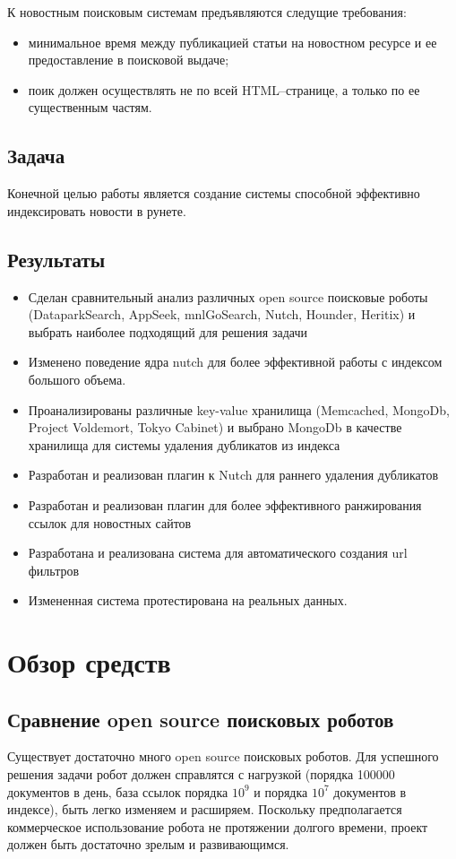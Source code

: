 К новостным поисковым системам предъявляются следущие требования:
\begin{itemize} 
\item минимальное время между публикацией статьи на новостном ресурсе и ее 
    предоставление в поисковой выдаче;
\item поик должен осуществлять не по всей HTML--странице, а только по ее 
    существенным частям. 
\end{itemize}

\section{Задача}
Конечной целью работы является создание системы способной эффективно индексировать новости в рунете.

\section{Результаты}
\begin{itemize}
 \item Сделан сравнительный анализ различных open source поисковые роботы (DataparkSearch,
AppSeek, mnlGoSearch, Nutch, Hounder, Heritix) и выбрать наиболее подходящий для
решения задачи
 \item Изменено поведение ядра nutch для более эффективной работы с индексом большого объема.
 \item Проанализированы различные key-value хранилища (Memcached, MongoDb, Project Voldemort, Tokyo Cabinet) и выбрано MongoDb в качестве хранилища для системы удаления дубликатов из индекса
 \item Разработан и реализован плагин к Nutch для раннего удаления дубликатов
 \item Разработан и реализован плагин для более эффективного ранжирования ссылок для новостных сайтов
 \item Разработана и реализована система для автоматического создания url фильтров
 \item Измененная система протестирована на реальных данных.
\end{itemize}

\chapter{Обзор средств}
\section{Сравнение open source поисковых роботов}
Существует достаточно много open source поисковых роботов. Для успешного решения задачи робот должен справлятся с нагрузкой (порядка 100000 документов в день, база ссылок порядка $10^{9}$ и порядка $10^7$ документов в индексе), быть легко изменяем и расширяем. Поскольку предполагается коммерческое использование робота не протяжении долгого времени, проект должен быть достаточно зрелым и развивающимся.
